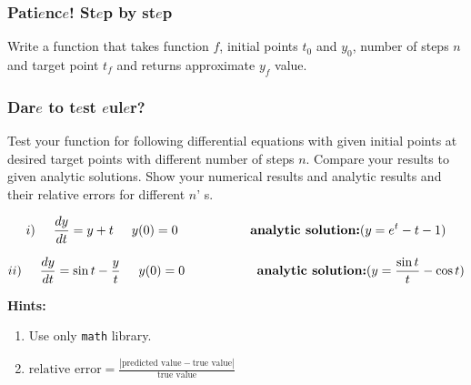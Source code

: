 \documentclass[a4paper]{article}
\begin{document}
\subsubsection{Pati$e$nc$e$! St$e$p by st$e$p}
Write a function that takes function $ f $, initial points $ t_0 $ and $ y_0 $, number of steps $ n $ and target point $ t_f $ and returns approximate $ y_f $ value.

\subsubsection{Dar$e$ to t$e$st $e$ul$e$r?}
Test your function for following differential equations with given initial points at desired target points with different number of steps $ n $. Compare your results to given analytic solutions. Show your numerical results and analytic results and their relative errors for different $ n $' s.

\begin{align*}
    i) \hspace{0.5cm} \frac{dy}{dt} = y + t \hspace{0.5cm} y(0) = 0 \hspace{2cm}  
    \textbf{analytic solution:} (y = e^t - t -1)
\end{align*}

\begin{align*}
    ii) \hspace{0.5cm} \frac{dy}{dt} = \sin{t} - \frac{y}{t} \hspace{0.5cm} y(0) = 0 \hspace{2cm}  
    \textbf{analytic solution:} (y = \frac{\sin{t}}{t} - \cos{t})
\end{align*}


\vspace{1cm}
\textbf{Hints:}
\begin{enumerate}
    \item Use only \verb|math| library.
    \item $ \text{relative error} = \frac{|\text{predicted value} - 
            \text{true value}|}{\text{true value}} $
\end{enumerate}

\newpage
\end{document}
